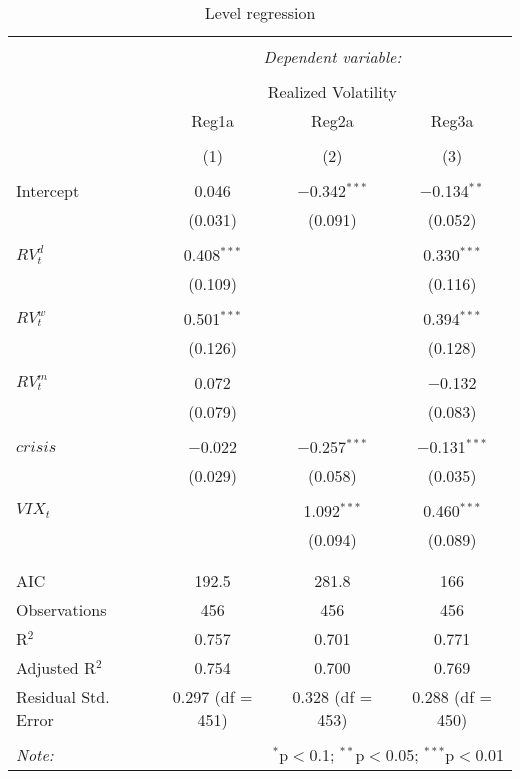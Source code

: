 
\begin{table}[!htbp] \centering 
  \caption{Level regression} 
  \label{} 
\begin{tabular}{@{\extracolsep{5pt}}lccc} 
\\[-1.8ex]\hline 
\hline \\[-1.8ex] 
 & \multicolumn{3}{c}{\textit{Dependent variable:}} \\ 
\cline{2-4} 
\\[-1.8ex] & \multicolumn{3}{c}{Realized Volatility} \\ 
 & Reg1a & Reg2a & Reg3a \\ 
\\[-1.8ex] & (1) & (2) & (3)\\ 
\hline \\[-1.8ex] 
 Intercept & 0.046 & $-$0.342$^{***}$ & $-$0.134$^{**}$ \\ 
  & (0.031) & (0.091) & (0.052) \\ 
  & & & \\ 
 $RV^{d}_{t}$ & 0.408$^{***}$ &  & 0.330$^{***}$ \\ 
  & (0.109) &  & (0.116) \\ 
  & & & \\ 
 $RV^{w}_{t}$ & 0.501$^{***}$ &  & 0.394$^{***}$ \\ 
  & (0.126) &  & (0.128) \\ 
  & & & \\ 
 $RV^{m}_{t}$ & 0.072 &  & $-$0.132 \\ 
  & (0.079) &  & (0.083) \\ 
  & & & \\ 
 $crisis$ & $-$0.022 & $-$0.257$^{***}$ & $-$0.131$^{***}$ \\ 
  & (0.029) & (0.058) & (0.035) \\ 
  & & & \\ 
 $VIX_{t}$ &  & 1.092$^{***}$ & 0.460$^{***}$ \\ 
  &  & (0.094) & (0.089) \\ 
  & & & \\ 
\hline \\[-1.8ex] 
AIC & 192.5 & 281.8 & 166 \\ 
Observations & 456 & 456 & 456 \\ 
R$^{2}$ & 0.757 & 0.701 & 0.771 \\ 
Adjusted R$^{2}$ & 0.754 & 0.700 & 0.769 \\ 
Residual Std. Error & 0.297 (df = 451) & 0.328 (df = 453) & 0.288 (df = 450) \\ 
\hline 
\hline \\[-1.8ex] 
\textit{Note:}  & \multicolumn{3}{r}{$^{*}$p$<$0.1; $^{**}$p$<$0.05; $^{***}$p$<$0.01} \\ 
\end{tabular} 
\end{table} 
